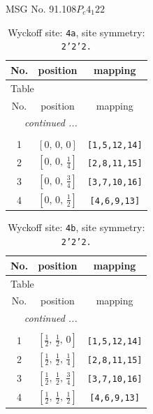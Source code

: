 \documentclass[fleqn,8pt]{jsarticle}
\begin{document}
\setcounter{MaxMatrixCols}{32}

\renewcommand{\tablename}{Table~}
\renewcommand{\figurename}{Figure~}
\begin{center}
\LARGE
MSG No. 91.108\quad$P_{c}4_{1}22$
\end{center}
\renewcommand{\arraystretch}{1.2}
\begin{longtable}{ccc}
\caption{Wyckoff site: {\tt 4a}, site symmetry: {\tt 2'2'2.}}
 \\
 \hline \hline
No. & position & mapping \\ \hline \endfirsthead

\multicolumn{2}{l}{\tablename\ \thetable{}} \\
 \hline \hline
No. & position & mapping \\ \hline \endhead

 \hline \hline
\multicolumn{2}{r}{\footnotesize\it continued ...} \\ \endfoot

 \hline \hline
\multicolumn{2}{r}{} \\ \endlastfoot

1 & $\left[ 0,\, 0,\, 0 \right]$ & {\tt [1,5,12,14]} \\ \hline
2 & $\left[ 0,\, 0,\, \frac{1}{4} \right]$ & {\tt [2,8,11,15]} \\ \hline
3 & $\left[ 0,\, 0,\, \frac{3}{4} \right]$ & {\tt [3,7,10,16]} \\ \hline
4 & $\left[ 0,\, 0,\, \frac{1}{2} \right]$ & {\tt [4,6,9,13]} \\
\end{longtable}
\renewcommand{\arraystretch}{1.2}
\begin{longtable}{ccc}
\caption{Wyckoff site: {\tt 4b}, site symmetry: {\tt 2'2'2.}}
 \\
 \hline \hline
No. & position & mapping \\ \hline \endfirsthead

\multicolumn{2}{l}{\tablename\ \thetable{}} \\
 \hline \hline
No. & position & mapping \\ \hline \endhead

 \hline \hline
\multicolumn{2}{r}{\footnotesize\it continued ...} \\ \endfoot

 \hline \hline
\multicolumn{2}{r}{} \\ \endlastfoot

1 & $\left[ \frac{1}{2},\, \frac{1}{2},\, 0 \right]$ & {\tt [1,5,12,14]} \\ \hline
2 & $\left[ \frac{1}{2},\, \frac{1}{2},\, \frac{1}{4} \right]$ & {\tt [2,8,11,15]} \\ \hline
3 & $\left[ \frac{1}{2},\, \frac{1}{2},\, \frac{3}{4} \right]$ & {\tt [3,7,10,16]} \\ \hline
4 & $\left[ \frac{1}{2},\, \frac{1}{2},\, \frac{1}{2} \right]$ & {\tt [4,6,9,13]} \\
\end{longtable}
\end{document}
